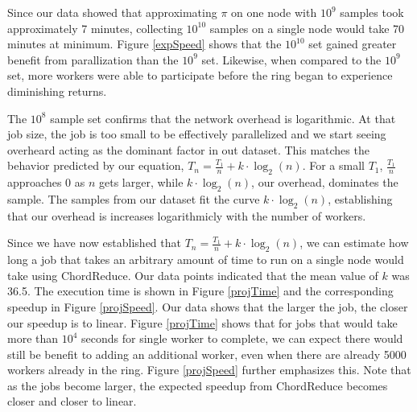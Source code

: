 \documentclass[conference, compsocconf, letterpaper]{IEEEtran}
\begin{document}
Since our data showed that approximating $\pi$ on one node with $10^{9}$ samples took approximately 7 minutes, collecting $10^{10}$ samples on a single node would take 70 minutes at minimum.  Figure \ref{expSpeed} shows that the $10^{10}$ set gained greater benefit from parallization than the $10^{9}$ set.  Likewise, when compared to the $10^{9}$ set, more workers were able to participate before the ring began to experience diminishing returns.

The $10^{8}$ sample set confirms that the network overhead is logarithmic.  At that job size, the job is too small to be effectively parallelized and we start seeing overheard acting as the dominant factor in out dataset.  This matches the behavior predicted by our equation, $T_{n} = \frac{T_{1}}{n} + k \cdot \log_{2}(n)$. For a small $T_{1}$, $\frac{T_{1}}{n}$  approaches 0 as $n$ gets larger, while $k \cdot \log_{2}(n)$, our overhead, dominates the sample.  The samples from our dataset fit the curve $k \cdot \log_{2}(n)$, establishing that our overhead is increases logarithmicly with the number of workers.


Since we have now established that $T_{n} = \frac{T_{1}}{n} + k \cdot \log_{2}(n)$, we can estimate how long a job that takes an arbitrary amount of time to run on a single node would take using ChordReduce.  Our data points indicated that the mean value of  $k$ was 36.5. The execution time is shown in Figure \ref{projTime} and the corresponding speedup in Figure \ref{projSpeed}.
Our data shows that the larger the job, the closer our speedup is to linear.  Figure \ref{projTime} shows that for jobs that would take more than $10^{4}$ seconds for single worker to complete, we can expect there would still be benefit to adding an additional worker, even when there are already 5000 workers already in the ring.  Figure \ref{projSpeed} further emphasizes this. Note that as the jobs become larger, the expected speedup from ChordReduce becomes closer and closer to linear.
\end{document}
